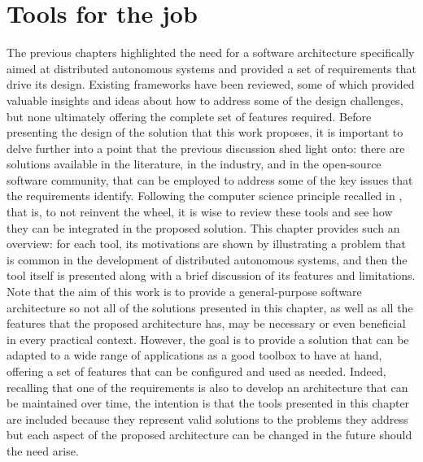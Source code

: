 \chapter{Tools for the job}
\label{ch:tools}
\vspace{-1.3cm}

The previous chapters highlighted the need for a software architecture specifically aimed at distributed autonomous systems and provided a set of requirements that drive its design. Existing frameworks have been reviewed, some of which provided valuable insights and ideas about how to address some of the design challenges, but none ultimately offering the complete set of features required. Before presenting the design of the solution that this work proposes, it is important to delve further into a point that the previous discussion shed light onto: there are solutions available in the literature, in the industry, and in the open-source software community, that can be employed to address some of the key issues that the requirements identify. Following the computer science principle recalled in , that is, to not reinvent the wheel, it is wise to review these tools and see how they can be integrated in the proposed solution. This chapter provides such an overview: for each tool, its motivations are shown by illustrating a problem that is common in the development of distributed autonomous systems, and then the tool itself is presented along with a brief discussion of its features and limitations. Note that the aim of this work is to provide a general-purpose software architecture so not all of the solutions presented in this chapter, as well as all the features that the proposed architecture has, may be necessary or even beneficial in every practical context. However, the goal is to provide a solution that can be adapted to a wide range of applications as a good toolbox to have at hand, offering a set of features that can be configured and used as needed. Indeed, recalling that one of the requirements is also to develop an architecture that can be maintained over time, the intention is that the tools presented in this chapter are included because they represent valid solutions to the problems they address but each aspect of the proposed architecture can be changed in the future should the need arise.




